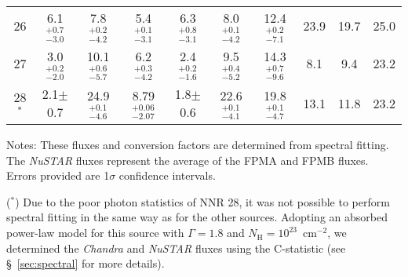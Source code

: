 \documentclass[iop,revtex4]{emulateapj}
\newcommand\T{\rule{0pt}{2.6ex}}       %
\newcommand\B{\rule[-1.2ex]{0pt}{0pt}} %
\newcommand\M{\rule{0pt}{2.3ex}}
\begin{document}
\begin{table}
\begin{minipage}{\linewidth}
\begin{adjustwidth}{-0.9in}{-0.9in}
\begin{threeparttable}
\begin{tabular}{cccccccccc}
\M 26&6.1$^{+0.7}_{-3.0}$&7.8$^{+0.2}_{-4.2}$&5.4$^{+0.1}_{-3.1}$&6.3$^{+0.8}_{-3.1}$&8.0$^{+0.1}_{-4.2}$&12.4$^{+0.2}_{-7.1}$&23.9&19.7&25.0\\
\M 27&3.0$^{+0.2}_{-2.0}$&10.1$^{+0.6}_{-5.7}$&6.2$^{+0.3}_{-4.2}$&2.4$^{+0.2}_{-1.6}$&9.5$^{+0.4}_{-5.2}$&14.3$^{+0.7}_{-9.6}$&8.1&9.4&23.2\\
\B\M 28$^*$&2.1$\pm$0.7&24.9$^{+0.1}_{-4.6}$&8.79$^{+0.06}_{-2.07}$&1.8$\pm$0.6&22.6$^{+0.1}_{-4.1}$&19.8$^{+0.1}_{-4.7}$&13.1&11.8&23.2\\
\hline \hline
\end{tabular}
\begin{tablenotes}[flushleft]
\item \T Notes: These fluxes and conversion factors are determined from spectral fitting.  The \textit{NuSTAR} fluxes represent the average of the FPMA and FPMB fluxes.  Errors provided are 1$\sigma$ confidence intervals.  

\item ($^*$) Due to the poor photon statistics of NNR 28, it was not possible to perform spectral fitting in the same way as for the other sources.  Adopting an absorbed power-law model for this source with $\Gamma=1.8$ and $N_{\mathrm{H}} = 10^{23}$~cm$^{-2}$, we determined the \textit{Chandra} and \textit{NuSTAR} fluxes using the C-statistic (see \S~\ref{sec:spectral} for more details).  
\end{tablenotes}
\label{tab:convfactors}
\end{threeparttable}
\end{adjustwidth}
\end{minipage}
\end{table}
\end{document}
